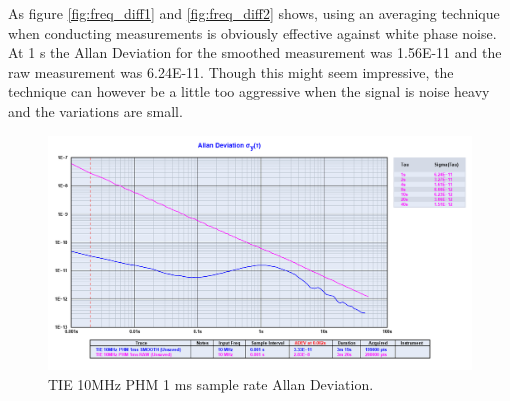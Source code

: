 \documentclass[11pt,english,a4paper]{article}
\begin{document}
\begin{figure}[!htb]
  \centering
  \hfill
\end{figure}
As figure \ref{fig:freq_diff1} and \ref{fig:freq_diff2} shows, using an averaging technique when conducting measurements is obviously effective against white phase noise. At 1 s the Allan Deviation for the smoothed measurement was 1.56E-11 and the raw measurement was 6.24E-11. Though this might seem impressive, the technique can however be a little too aggressive when the signal is noise heavy and the variations are small. 

\begin{figure}[!htb]
  \centering
    \includegraphics[width=1\textwidth]{tie_10mhz_phm_1ms_allan.png}
    \caption{TIE 10MHz PHM 1 ms sample rate Allan Deviation.}
        \label{fig:PHM_10MHz_allan_dev}
\end{figure}
\end{document}

